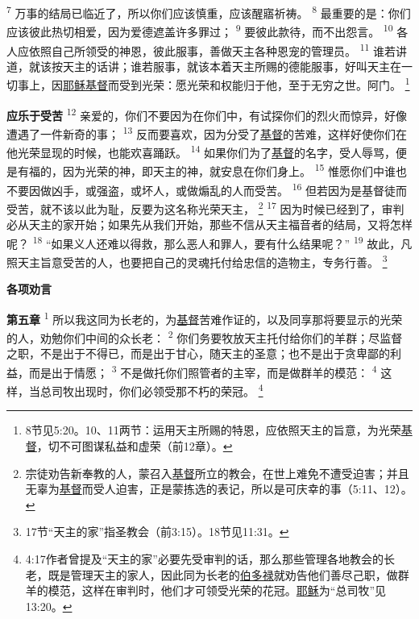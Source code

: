 \textsuperscript{7}
万事的结局已临近了，所以你们应该慎重，应该醒寤祈祷。
\textsuperscript{8}
最重要的是：你们应该彼此热切相爱，因为爱德遮盖许多罪过；
\textsuperscript{9}
要彼此款待，而不出怨言。
\textsuperscript{10}
各人应依照自己所领受的神恩，彼此服事，善做天主各种恩宠的管理员。
\textsuperscript{11}
谁若讲道，就该按天主的话讲；谁若服事，就该本着天主所赐的德能服事，好叫天主在一切事上，因\uline{耶稣}\uline{基督}而受到光荣：愿光荣和权能归于他，至于无穷之世。阿门。
\footnote{8节见5:20。10、11两节：运用天主所赐的特恩，应依照天主的旨意，为光荣\uline{基督}，切不可图谋私益和虚荣（前12章）。}

\textbf{应乐于受苦\quad}
\textsuperscript{12}
亲爱的，你们不要因为在你们中，有试探你们的烈火而惊异，好像遭遇了一件新奇的事；
\textsuperscript{13}
反而要喜欢，因为分受了\uline{基督}的苦难，这样好使你们在他光荣显现的时候，也能欢喜踊跃。
\textsuperscript{14}
如果你们为了\uline{基督}的名字，受人辱骂，便是有福的，因为光荣的神，即天主的神，就安息在你们身上。
\textsuperscript{15}
惟愿你们中谁也不要因做凶手，或强盗，或坏人，或做煽乱的人而受苦。
\textsuperscript{16}
但若因为是基督徒而受苦，就不该以此为耻，反要为这名称光荣天主，
\footnote{宗徒劝告新奉教的人，蒙召入\uline{基督}所立的教会，在世上难免不遭受迫害；并且无辜为\uline{基督}而受人迫害，正是蒙拣选的表记，所以是可庆幸的事（5:11、12）。}
\textsuperscript{17}
因为时候已经到了，审判必从天主的家开始；如果先从我们开始，那些不信从天主福音者的结局，又将怎样呢？
\textsuperscript{18}
“如果义人还难以得救，那么恶人和罪人，要有什么结果呢？”
\textsuperscript{19}
故此，凡照天主旨意受苦的人，也要把自己的灵魂托付给忠信的造物主，专务行善。
\footnote{17节“天主的家”指圣教会（前3:15）。18节见11:31。}

\begin{center}
	\textbf{\large{\songti 各项劝言}}
\end{center}

\textbf{第五章\quad}
\textsuperscript{1}
所以我这同为长老的，为\uline{基督}苦难作证的，以及同享那将要显示的光荣的人，劝勉你们中间的众长老：
\textsuperscript{2}
你们务要牧放天主托付给你们的羊群；尽监督之职，不是出于不得已，而是出于甘心，随天主的圣意；也不是出于贪卑鄙的利益，而是出于情愿；
\textsuperscript{3}
不是做托你们照管者的主宰，而是做群羊的模范：
\textsuperscript{4}
这样，当总司牧出现时，你们必领受那不朽的荣冠。
\footnote{4:17作者曾提及“天主的家”必要先受审判的话，那么那些管理各地教会的长老，既是管理天主的家人，因此同为长老的\uline{伯多禄}就劝告他们善尽己职，做群羊的模范，这样在审判时，他们才可领受光荣的花冠。\uline{耶稣}为“总司牧”见13:20。}

